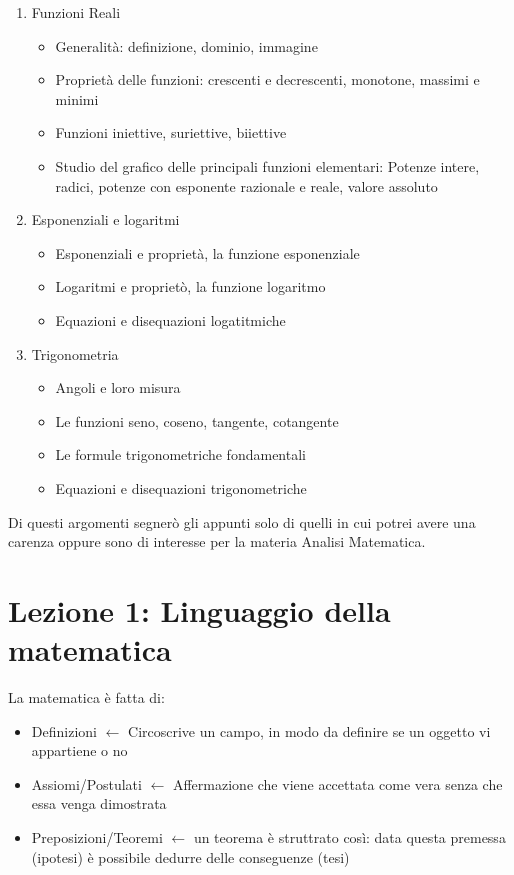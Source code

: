 \documentclass[12pt, a4paper, openany]{book}
\begin{document}
\begin{enumerate}
\begin{itemize}
    \end{itemize}
    \item Funzioni Reali
    \begin{itemize}
        \item Generalità: definizione, dominio, immagine
        \item Proprietà delle funzioni: crescenti e decrescenti, monotone, massimi e minimi
        \item Funzioni iniettive, suriettive, biiettive
        \item Studio del grafico delle principali funzioni elementari: Potenze intere, radici, potenze con esponente razionale e reale, valore assoluto
    \end{itemize}
    \item Esponenziali e logaritmi
    \begin{itemize}
        \item Esponenziali e proprietà, la funzione esponenziale
        \item Logaritmi e proprietò, la funzione logaritmo
        \item Equazioni e disequazioni logatitmiche
    \end{itemize}
    \item Trigonometria
    \begin{itemize}
        \item Angoli e loro misura
        \item Le funzioni seno, coseno, tangente, cotangente
        \item Le formule trigonometriche fondamentali
        \item Equazioni e disequazioni trigonometriche
    \end{itemize}
\end{enumerate}
Di questi argomenti segnerò gli appunti solo di quelli in cui potrei avere una carenza oppure sono di interesse per la materia Analisi Matematica.
\section{Lezione 1: Linguaggio della matematica}
La matematica è fatta di:
\begin{itemize}
    \item Definizioni $\leftarrow$ Circoscrive un campo, in modo da definire se un oggetto vi appartiene o no
    \item Assiomi/Postulati $\leftarrow$  Affermazione che viene accettata come vera senza che essa venga dimostrata
    \item Preposizioni/Teoremi $\leftarrow$  un teorema è struttrato così: data questa premessa (ipotesi) è possibile dedurre delle conseguenze (tesi)
\end{itemize}
\end{document}
